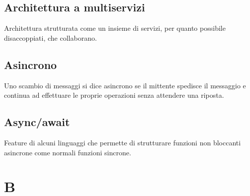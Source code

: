 


\subsection*{Architettura a multiservizi}
Architettura strutturata come un insieme di servizi, per quanto possibile disaccoppiati, che collaborano.

\subsection*{Asincrono}
Uno scambio di messaggi si dice asincrono se il mittente spedisce il messaggio e continua ad effettuare le proprie operazioni senza attendere una riposta.

\subsection*{Async/await}
Feature di alcuni linguaggi che permette di strutturare funzioni non bloccanti asincrone come normali funzioni sincrone.

\clearpage
\section*{B}


